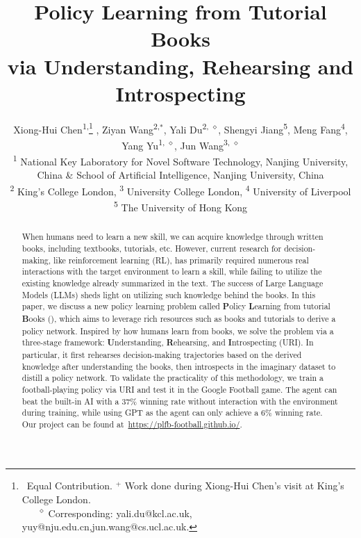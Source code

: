 \documentclass{article}
\title{Policy Learning from Tutorial Books \\ via Understanding, Rehearsing and Introspecting}
\author{%
  Xiong-Hui Chen\textsuperscript{1,}\thanks{~Equal Contribution. $^+$ Work done during Xiong-Hui Chen's visit at King's College London. \\ \textsuperscript{$\quad \quad \diamond$} Corresponding: yali.du@kcl.ac.uk,  yuy@nju.edu.cn,jun.wang@cs.ucl.ac.uk. } , 
  Ziyan Wang\textsuperscript{2,}$^*$, 
  Yali Du\textsuperscript{\rm 2, $\diamond$}, 
  Shengyi Jiang\textsuperscript{\rm 5}, 
  Meng Fang\textsuperscript{\rm 4}, 
  Yang Yu\textsuperscript{\rm 1, $\diamond$}, 
  Jun Wang\textsuperscript{\rm 3, $\diamond$}\\
  \textsuperscript{\rm 1} National Key Laboratory for Novel Software Technology, Nanjing University, China
\& School of Artificial Intelligence, Nanjing University, China \\
  \textsuperscript{\rm 2} King's College London, \textsuperscript{\rm 3} 	University College London,  \textsuperscript{\rm 4} University of Liverpool \\ \textsuperscript{\rm 5} The University of Hong Kong 
}
\begin{document}
\doparttoc %
\faketableofcontents %

\maketitle

\begin{abstract}
    When humans need to learn a new skill, we can acquire knowledge through written books, including textbooks, tutorials, etc. However, current research for decision-making, like reinforcement learning (RL), has primarily required numerous real interactions with the target environment to learn a skill, while failing to utilize the existing knowledge already summarized in the text. The success of Large Language Models (LLMs) sheds light on utilizing such knowledge behind the books. 
    In this paper, we discuss a new policy learning problem called \textbf{P}olicy \textbf{L}earning from tutorial \textbf{B}ooks (\topic), which aims to leverage rich resources such as books and tutorials to derive a policy network. Inspired by how humans learn from books, we solve the problem via a three-stage framework: \textbf{U}nderstanding, \textbf{R}ehearsing, and \textbf{I}ntrospecting (URI). In particular, it first rehearses decision-making trajectories based on the derived knowledge after understanding the books, then introspects in the imaginary dataset to distill a policy network. 
    To validate the practicality of this methodology, we train a football-playing policy via URI and test it in the Google Football game. The agent can beat the built-in AI with a 37\% winning rate without interaction with the environment during training, while using GPT as the agent can only achieve a 6\% winning rate. Our project can be found at~\url{https://plfb-football.github.io/}.
    
\end{abstract}


















\appendix




\end{document}
